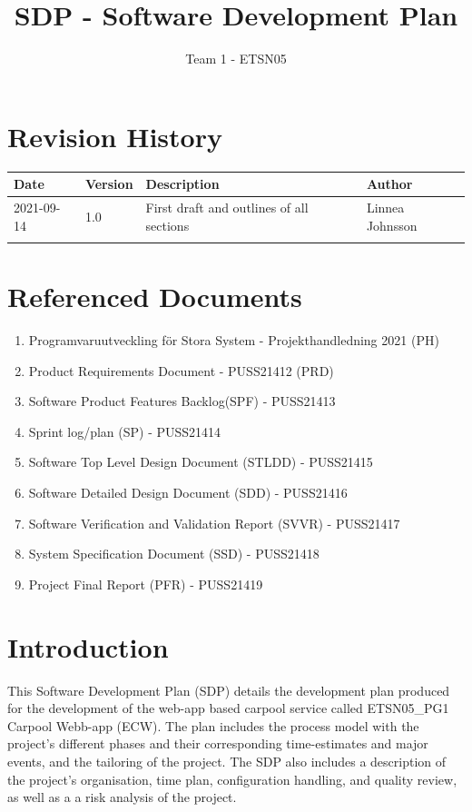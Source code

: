 \documentclass{article}
\title{SDP - Software Development Plan}
\author{Team 1 - ETSN05}
\newcommand{\nameNospace}{ECW}
\begin{document}
\date{}
\maketitle
\thispagestyle{fancy}
\newpage

\section*{Revision History}
\begin{table}[h]
    \centering
    \begin{tabular}{|l|l|p{55mm}|l|}
    \hline
    Date & Version & Description & Author \\ 
    \hline\hline 
    2021-09-14 & 1.0 & First draft and outlines of all sections & Linnea Johnsson \\
    \hline
    & & & \\ 
    \hline
    \end{tabular}
    \label{tab:history}
\end{table}
\newpage
 
\section*{Referenced Documents}\label{refdoc}
\begin{enumerate}
    \item Programvaruutveckling för Stora System - Projekthandledning 2021 (PH)
    \item Product Requirements Document - PUSS21412 (PRD)
    \item Software Product Features Backlog(SPF) - PUSS21413
    \item Sprint log/plan (SP) - PUSS21414
    \item Software Top Level Design Document (STLDD) - PUSS21415
    \item Software Detailed Design Document (SDD) - PUSS21416
    \item Software Verification and Validation Report (SVVR) - PUSS21417
    \item System Specification Document (SSD) - PUSS21418
    \item Project Final Report (PFR) - PUSS21419

\end{enumerate}
\newpage

\tableofcontents
\newpage

\section{Introduction}
This Software Development Plan (SDP) details the development plan produced for the development of the web-app based carpool service called ETSN05\_PG1 Carpool Webb-app (\nameNospace). The plan includes the process model with the project's different phases and their corresponding time-estimates and major events, and the tailoring of the project. The SDP also includes a description of the project's organisation, time plan, configuration handling, and quality review, as well as a a risk analysis of the project.  
\end{document}
